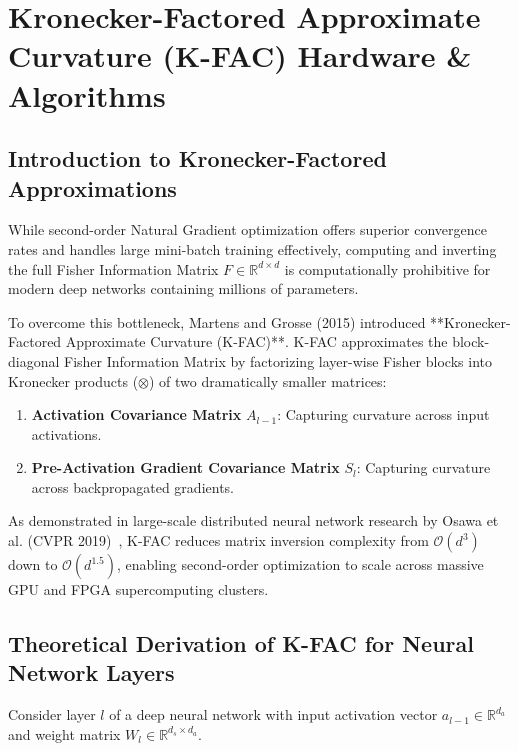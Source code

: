 \chapter{Kronecker-Factored Approximate Curvature (K-FAC) Hardware \& Algorithms}
\label{ch:kfac}

\section{Introduction to Kronecker-Factored Approximations}
While second-order Natural Gradient optimization offers superior convergence rates and handles large mini-batch training effectively, computing and inverting the full Fisher Information Matrix $F \in \mathbb{R}^{d \times d}$ is computationally prohibitive for modern deep networks containing millions of parameters.

To overcome this bottleneck, Martens and Grosse (2015) introduced **Kronecker-Factored Approximate Curvature (K-FAC)**. K-FAC approximates the block-diagonal Fisher Information Matrix by factorizing layer-wise Fisher blocks into Kronecker products ($\otimes$) of two dramatically smaller matrices:
\begin{enumerate}[leftmargin=*]
    \item \textbf{Activation Covariance Matrix} $A_{l-1}$: Capturing curvature across input activations.
    \item \textbf{Pre-Activation Gradient Covariance Matrix} $S_l$: Capturing curvature across backpropagated gradients.
\end{enumerate}

As demonstrated in large-scale distributed neural network research by Osawa et al. (CVPR 2019)~\cite{osawa2019large}, K-FAC reduces matrix inversion complexity from $\mathcal{O}(d^3)$ down to $\mathcal{O}(d^{1.5})$, enabling second-order optimization to scale across massive GPU and FPGA supercomputing clusters.

\section{Theoretical Derivation of K-FAC for Neural Network Layers}
Consider layer $l$ of a deep neural network with input activation vector $a_{l-1} \in \mathbb{R}^{d_a}$ and weight matrix $W_l \in \mathbb{R}^{d_s \times d_a}$. 

